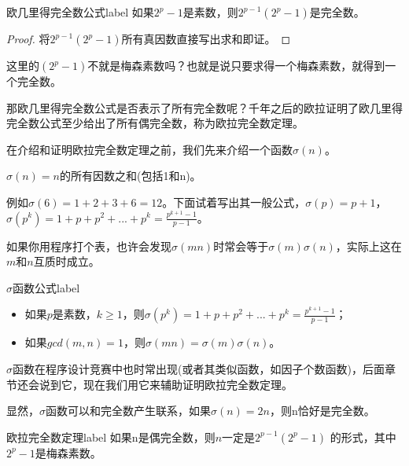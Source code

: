 \begin{theorem}{欧几里得完全数公式}{label}
	如果$2^p-1$是素数，则$2^{p-1}(2^p-1)$是完全数。
\end{theorem}

\begin{proof}
	将$2^{p-1}(2^p-1)$所有真因数直接写出求和即证。
\end{proof}

这里的$(2^p-1)$不就是梅森素数吗？也就是说只要求得一个梅森素数，就得到一个完全数。

那欧几里得完全数公式是否表示了所有完全数呢？千年之后的欧拉证明了欧几里得完全数公式至少给出了所有{\heiti 偶完全数}，称为欧拉完全数定理。

在介绍和证明欧拉完全数定理之前，我们先来介绍一个函数$\sigma(n)$。

\begin{center}
	$\sigma(n) = n$的所有因数之和(包括1和n)。
\end{center}

例如$\sigma(6) = 1 + 2+3+6 = 12$。下面试着写出其一般公式，$\sigma(p) = p+1$，$\sigma(p^k) = 1 + p+p^2+...+p^k = \frac{p^{k+1}-1}{p-1}$。

如果你用程序打个表，也许会发现$\sigma(mn)$时常会等于$\sigma(m)\sigma(n)$，实际上这在$m$和$n$互质时成立。

\begin{theorem}{$\sigma$函数公式}{label}
	\begin{itemize}
		\item 如果$p$是素数，$k\ge1$，则$\sigma(p^k) = 1 + p+p^2+...+p^k = \frac{p^{k+1}-1}{p-1}$；
		\item 如果$gcd(m,n)=1$，则$\sigma(mn) = \sigma(m)\sigma(n)$。
	\end{itemize} 
\end{theorem}

$\sigma$函数在程序设计竞赛中也时常出现(或者其类似函数，如因子个数函数)，后面章节还会说到它，现在我们用它来辅助证明欧拉完全数定理。

显然，$\sigma$函数可以和完全数产生联系，如果$\sigma(n)=2n$，则n恰好是完全数。

\begin{theorem}{欧拉完全数定理}{label}
如果n是偶完全数，则$n$一定是$2^{p-1}(2^p-1)$ 的形式，其中$2^p-1$是梅森素数。
\end{theorem}

